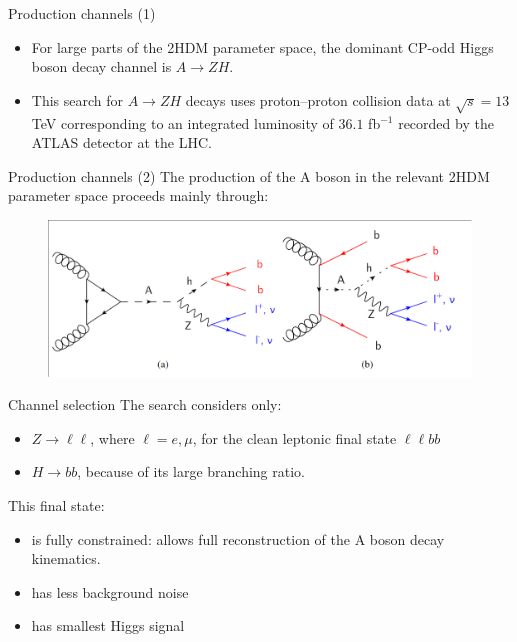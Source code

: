 \documentclass[10pt]{beamer} %
\begin{document}
\begin{frame}{Production channels (1)}
\begin{itemize}
    \item For large parts of the 2HDM parameter space, the dominant CP-odd Higgs boson decay channel is $A \to ZH$. 
    \item This search for $A \to ZH$ decays uses proton–proton collision data at $\sqrt{s} = 13$ TeV corresponding to an integrated luminosity of $36.1$ fb$^{−1}$ recorded by the ATLAS detector at the LHC. 
   
\end{itemize}
\end{frame}

\begin{frame}{Production channels (2)}
     The production of the A boson in the relevant 2HDM parameter space proceeds mainly through:

    \begin{figure}
        \centering
        \includegraphics[width=1.0\textwidth]{Figs/FeynmanGraph_PseudoScalarProduction.pdf}
    \end{figure}    


\end{frame}


\begin{frame}{Channel selection}
The search considers only:
\begin{itemize}
    \item $Z \to \ell\ell$, where $\ell = e, \mu$, for the clean leptonic final state $\ell \ell b b$
    \item $H \to bb$, because of its large branching ratio.
\end{itemize}

This final state:
\begin{itemize}
    \item is fully constrained: allows full reconstruction of the A boson decay kinematics.
    \item has less background noise
    \item has smallest Higgs signal
\end{itemize} 

\end{frame}
\end{document}
